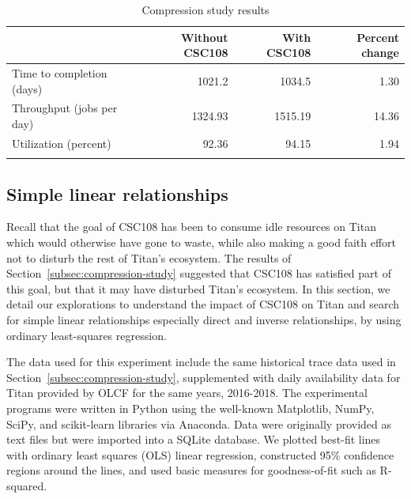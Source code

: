 \begin{table}
\caption{Compression study results}
\label{tab:compression-results}       %
\begin{tabular}{lrrr}
\hline\noalign{\smallskip}
\phantom{booga}     &   Without CSC108  &   With CSC108 &   Percent change  \\
\hline\noalign{\smallskip}
Time to completion (days)           &   1021.2  &   1034.5  &   1.30        \\
Throughput (jobs per day)           &   1324.93 &   1515.19 &   14.36       \\
Utilization (percent)               &   92.36   &   94.15   &   1.94        \\
\noalign{\smallskip}\hline
\end{tabular}
\end{table}


\subsection{Simple linear relationships}
\label{subsec:simple-linear-relationships}



Recall that the goal of CSC108 has been to consume idle resources on Titan
which would otherwise have gone to waste, while also making a good faith
effort not to disturb the rest of Titan's ecosystem.  The results of
Section~\ref{subsec:compression-study} suggested that CSC108 has satisfied
part of this goal, but that it may have disturbed Titan's ecosystem. In this
section, we detail our explorations to understand the impact of CSC108 on
Titan and search for simple linear relationships 
especially direct and inverse relationships, by using ordinary least-squares
regression. 

The data used for this experiment include the same historical trace data used
in Section~\ref{subsec:compression-study}, supplemented with daily availability
data for Titan provided by OLCF for the same years, 2016-2018. The experimental
programs were written in Python using the well-known Matplotlib, NumPy, SciPy,
and scikit-learn libraries via Anaconda. Data were originally provided as text
files but were imported into a SQLite database. We plotted best-fit lines with
ordinary least squares (OLS) linear regression, constructed 95\% confidence
regions around the lines, and used basic measures for goodness-of-fit such as
R-squared.

